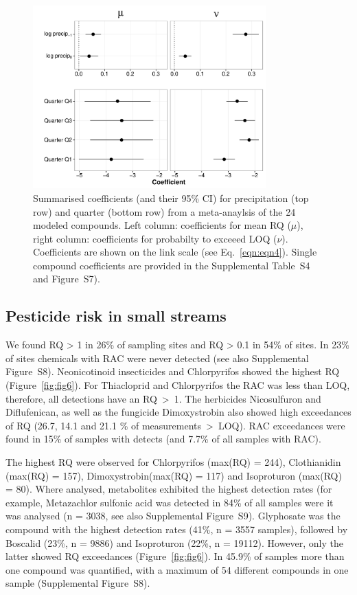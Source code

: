 \documentclass[journal=esthag,manuscript=article]{achemso}
\begin{document}
\begin{figure}[ht]
  \includegraphics[width=0.8\textwidth]{figure5.pdf}
  \caption{Summarised coefficients (and their 95\% CI) for precipitation (top row) and quarter (bottom row) from a meta-anaylsis of the 24 modeled compounds. Left column: coefficients for mean RQ ($\mu$), right column: coefficients for probabilty to exceeed LOQ ($\nu$). 
  Coefficients are shown on the link scale (see Eq.~\ref{eqn:eqn4}).
  Single compound coefficients are provided in the Supplemental Table~S4 and Figure~S7).
  }
  \label{fig:fig5}
\end{figure}



\subsection{Pesticide risk in small streams}
We found RQ > 1 in 26\% of sampling sites and RQ > 0.1 in 54\% of sites. 
In 23\% of sites chemicals with RAC were never detected (see also Supplemental Figure~S8).
Neonicotinoid insecticides and Chlorpyrifos showed the highest RQ (Figure~\ref{fig:fig6}). %
For Thiacloprid and Chlorpyrifos the RAC was less than LOQ, therefore, all detections have an RQ~\textgreater~1. 
The herbicides Nicosulfuron and Diflufenican, as well as the fungicide Dimoxystrobin also showed high exceedances of RQ (26.7, 14.1 and 21.1 \% of measurements~\textgreater~LOQ).
RAC exceedances were found in 15\% of samples with detects (and 7.7\% of all samples with RAC).

The highest RQ were observed for Chlorpyrifos (max(RQ) = 244), Clothianidin (max(RQ) = 157), Dimoxystrobin(max(RQ) = 117) and Isoproturon (max(RQ) = 80). 
Where analysed, metabolites exhibited the highest detection rates (for example, Metazachlor sulfonic acid was detected in 84\% of all samples were it was analysed (n = 3038, see also Supplemental Figure~S9).
Glyphosate was the compound with the highest detection rates (41\%, n = 3557 samples), followed by Boscalid (23\%, n = 9886) and Isoproturon (22\%, n = 19112). 
However, only the latter showed RQ exceedances (Figure~\ref{fig:fig6}).
In 45.9\% of samples more than one compound was quantified, with a maximum of 54 different compounds in one sample (Supplemental Figure~S8). 
\end{document}
